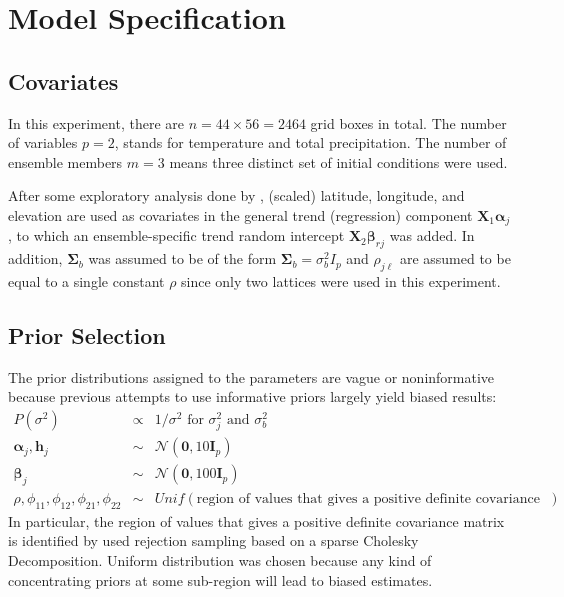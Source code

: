 \documentclass{article}
\begin{document}
\section{Model Specification}
\subsection{Covariates}
In this experiment, there are $n = 44 \times 56 = 2464$ grid boxes in total. The number of variables $p = 2$, stands for temperature and total precipitation. The number of ensemble members $m = 3$ means three distinct set of initial conditions were used.

After some exploratory analysis done by \cite{paper}, (scaled) latitude, longitude, and elevation are used as covariates in the general trend (regression) component $\boldsymbol{X}_1 \boldsymbol{\alpha}_j$, to which an ensemble-specific trend random intercept $\boldsymbol{X}_2 \boldsymbol{\beta}_{rj}$ was added.
In addition, $\boldsymbol{\Sigma}_b$ was assumed to be of the form $\boldsymbol{\Sigma}_b = \sigma_{b}^2 I_{p}$ and $\rho_{j\ell}$ are assumed to be equal to a single constant $\rho$ since only two lattices were used in this experiment.

\subsection{Prior Selection}
\label{sec: priors}
The prior distributions assigned to the parameters are vague or noninformative because previous attempts to use informative priors largely yield biased results: 
\begin{eqnarray*}
    P(\sigma^2) &\propto& 1/\sigma^2 \text{ for } \sigma_{j}^2 \text{ and } \sigma_{b}^2\\
    \boldsymbol{\alpha}_j, \boldsymbol{h}_j &\sim& \mathcal{N}(\boldsymbol{0}, 10 \boldsymbol{I}_p) \\
    \boldsymbol{\beta}_j &\sim& \mathcal{N}(\boldsymbol{0}, 100 \boldsymbol{I}_p) \\
    \rho, \phi_{11}, \phi_{12}, \phi_{21}, \phi_{22} &\sim& Unif(\text{region of values that gives a positive definite covariance matrix})
\end{eqnarray*}
In particular, the region of values that gives a positive definite covariance matrix is identified by \cite{paper} used rejection sampling based on a sparse Cholesky Decomposition. Uniform distribution was chosen because any kind of concentrating priors at some sub-region will lead to biased estimates. 
\end{document}
